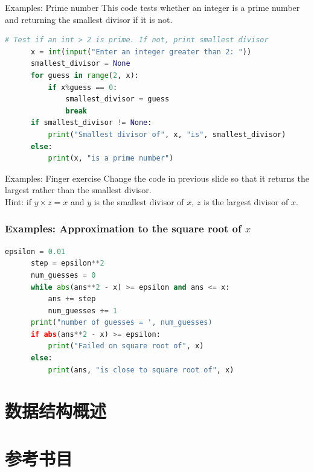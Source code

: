 \documentclass{sintefbeamer}
\begin{document}
\begin{frame}[fragile]{Examples: Prime number}
  This code tests whether an integer is a prime number and returning the smallest divisor if it is not.
  \pause
  \begin{block}{}
    \begin{lstlisting}[language=Python]
      # Test if an int > 2 is prime. If not, print smallest divisor
      x = int(input("Enter an integer greater than 2: "))
      smallest_divisor = None
      for guess in range(2, x):
          if x%guess == 0:
              smallest_divisor = guess
              break
      if smallest_divisor != None:
          print("Smallest divisor of", x, "is", smallest_divisor)
      else:
          print(x, "is a prime number")
    \end{lstlisting}
  \end{block}
\end{frame}

\begin{frame}[fragile]{Examples: \textcolor{airforceblue}{Finger exercise}}
  Change the code in previous slide so that it returns the largest rather than the smallest divisor. \\[10pt]

  \pause
  Hint: if $y \times z = x$ and $y$ is the smallest divisor of $x$, $z$ is the largest divisor of $x$.
\end{frame}

\begin{frame}[fragile]
  \frametitle{Examples: Approximation to the square root of $x$}

  \begin{block}{}
    \begin{lstlisting}[language=Python]
      epsilon = 0.01
      step = epsilon**2
      num_guesses = 0
      while abs(ans**2 - x) >= epsilon and ans <= x:
          ans += step
          num_guesses += 1
      print("number of guesses = ', num_guesses)
      if abs(ans**2 - x) >= epsilon:
          print("Failed on square root of", x)
      else:
          print(ans, "is close to square root of", x)
    \end{lstlisting}
  \end{block}

\end{frame}

\section{数据结构概述}

\section{参考书目}

\backmatter
\end{document}
